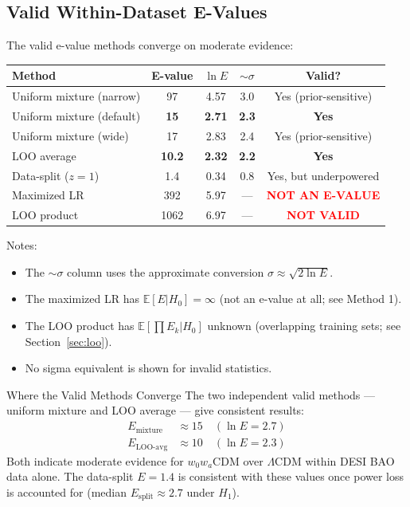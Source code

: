 \documentclass[11pt,a4paper]{article}
\newcommand{\E}{\mathbb{E}}
\newcommand{\LCDM}{$\Lambda$CDM}
\begin{document}
\subsection{Valid Within-Dataset E-Values}

The valid e-value methods converge on moderate evidence:

\begin{center}
\begin{tabular}{lcccc}
\toprule
\textbf{Method} & \textbf{E-value} & $\ln E$ & \textbf{$\sim\sigma$} & \textbf{Valid?} \\
\midrule
Uniform mixture (narrow) & 97 & 4.57 & 3.0 & Yes (prior-sensitive) \\
Uniform mixture (default) & \textbf{15} & \textbf{2.71} & \textbf{2.3} & \textbf{Yes} \\
Uniform mixture (wide) & 17 & 2.83 & 2.4 & Yes (prior-sensitive) \\
LOO average & \textbf{10.2} & \textbf{2.32} & \textbf{2.2} & \textbf{Yes} \\
Data-split ($z = 1$) & 1.4 & 0.34 & 0.8 & Yes, but underpowered \\
\midrule
Maximized LR & 392 & 5.97 & --- & \textcolor{red}{\textbf{NOT AN E-VALUE}} \\
LOO product & 1062 & 6.97 & --- & \textcolor{red}{\textbf{NOT VALID}} \\
\bottomrule
\end{tabular}
\end{center}

\noindent Notes:
\begin{itemize}
    \item The $\sim\sigma$ column uses the approximate conversion $\sigma \approx \sqrt{2\ln E}$.
    \item The maximized LR has $\E[E|H_0] = \infty$ (not an e-value at all; see Method 1).
    \item The LOO product has $\E[\prod E_k | H_0]$ unknown (overlapping training sets; see Section~\ref{sec:loo}).
    \item No sigma equivalent is shown for invalid statistics.
\end{itemize}

\begin{conceptbox}{Where the Valid Methods Converge}
The two independent valid methods --- uniform mixture and LOO average --- give consistent results:
\begin{align}
E_{\text{mixture}} &\approx 15 \quad (\ln E = 2.7) \\
E_{\text{LOO-avg}} &\approx 10 \quad (\ln E = 2.3)
\end{align}
Both indicate moderate evidence for $w_0w_a$CDM over \LCDM{} within DESI BAO data alone. The data-split $E = 1.4$ is consistent with these values once power loss is accounted for (median $E_{\text{split}} \approx 2.7$ under $H_1$).
\end{conceptbox}
\end{document}
